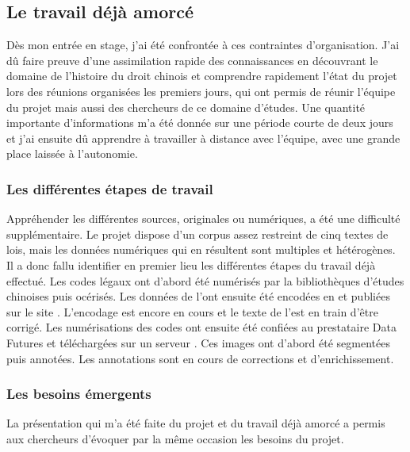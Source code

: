 \subsection{Le travail déjà amorcé}
Dès mon entrée en stage, j'ai été confrontée à ces contraintes d'organisation. J'ai dû faire preuve d'une assimilation rapide des connaissances en découvrant le domaine de l'histoire du droit chinois et comprendre rapidement l'état du projet lors des réunions organisées les premiers jours, qui ont permis de réunir l'équipe du projet mais aussi des chercheurs de ce domaine d'études. Une quantité importante d'informations m'a été donnée sur une période courte de deux jours et j'ai ensuite dû apprendre à travailler à distance avec l'équipe, avec une grande place laissée à l'autonomie.

\subsubsection{Les différentes étapes de travail}
Appréhender les différentes sources, originales ou numériques, a été une difficulté supplémentaire. Le projet dispose d'un corpus assez restreint de cinq textes de lois, mais les données numériques qui en résultent sont multiples et hétérogènes. Il a donc fallu identifier en premier lieu les différentes étapes du travail déjà effectué. Les codes légaux ont d'abord été numérisés par la bibliothèques d'études chinoises puis océrisés. Les données de l'\OCR ont ensuite été encodées en \XML et publiées sur le site \LSC. L'encodage est encore en cours et le texte de l'\OCR est en train d'être corrigé. Les numérisations des codes ont ensuite été confiées au prestataire Data Futures et téléchargées sur un serveur \IIIF. Ces images ont d'abord été segmentées puis annotées. Les annotations sont en cours de corrections et d'enrichissement. 

\subsubsection{Les besoins émergents}
La présentation qui m'a été faite du projet et du travail déjà amorcé a permis aux chercheurs d'évoquer par la même occasion les besoins du projet. 


